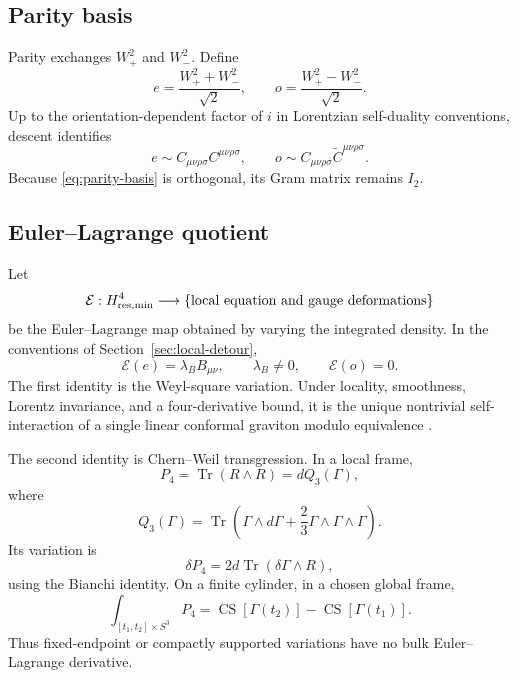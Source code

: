 \documentclass[11pt]{article}
\theoremstyle{definition}
\theoremstyle{remark}
\newcommand{\cE}{\mathcal E}
\newcommand{\Tr}{\operatorname{Tr}}
\newcommand{\CS}{\operatorname{CS}}
\begin{document}
\subsection{Parity basis}

Parity exchanges $W_+^2$ and $W_-^2$.  Define
\begin{equation}\label{eq:parity-basis}
 e=\frac{W_+^2+W_-^2}{\sqrt2},
 \qquad
 o=\frac{W_+^2-W_-^2}{\sqrt2}.
\end{equation}
Up to the orientation-dependent factor of $i$ in Lorentzian self-duality
conventions, descent identifies
\begin{equation}
 e\sim C_{\mu\nu\rho\sigma}C^{\mu\nu\rho\sigma},
 \qquad
 o\sim C_{\mu\nu\rho\sigma}\widetilde
 C^{\mu\nu\rho\sigma}.
\end{equation}
Because \eqref{eq:parity-basis} is orthogonal, its Gram matrix remains
$I_2$.

\subsection{Euler--Lagrange quotient}

Let
\begin{equation}
 \cE:H^4_{\rm res,min}
 \longrightarrow
 \{\text{local equation and gauge deformations}\}
\end{equation}
be the Euler--Lagrange map obtained by varying the integrated density.  In
the conventions of Section~\ref{sec:local-detour},
\begin{equation}\label{eq:EL-map}
 \cE(e)=\lambda_B B_{\mu\nu},
 \qquad \lambda_B\ne0,
 \qquad
 \cE(o)=0.
\end{equation}
The first identity is the Weyl-square variation.  Under locality,
smoothness, Lorentz invariance, and a four-derivative bound, it is the unique
nontrivial self-interaction of a single linear conformal graviton modulo
equivalence \cite{BoulangerHenneaux}.

The second identity is Chern--Weil transgression.  In a local frame,
\begin{equation}\label{eq:chern-weil}
 P_4=\Tr(R\wedge R)=dQ_3(\Gamma),
\end{equation}
where
\begin{equation}\label{eq:CS3}
 Q_3(\Gamma)=\Tr\left(
 \Gamma\wedge d\Gamma+\frac23\Gamma\wedge\Gamma\wedge\Gamma
 \right).
\end{equation}
Its variation is
\begin{equation}\label{eq:Pvariation}
 \delta P_4=2d\Tr(\delta\Gamma\wedge R),
\end{equation}
using the Bianchi identity.  On a finite cylinder, in a chosen global frame,
\begin{equation}\label{eq:finite-cylinder-P}
 \int_{[t_1,t_2]\times S^3}P_4
 =\CS[\Gamma(t_2)]-\CS[\Gamma(t_1)].
\end{equation}
Thus fixed-endpoint or compactly supported variations have no bulk
Euler--Lagrange derivative.
\end{document}
